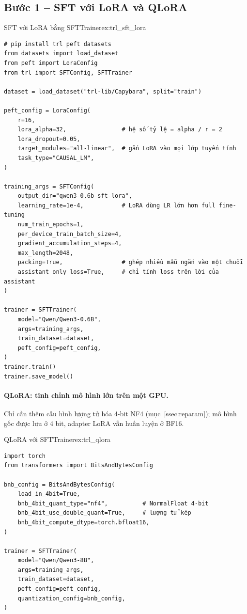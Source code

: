 \subsection{Bước 1 -- SFT với LoRA và QLoRA}
\label{ssec:trl_sft}

\begin{example}{SFT với LoRA bằng SFTTrainer}{ex:trl_sft_lora}
\begin{verbatim}
# pip install trl peft datasets
from datasets import load_dataset
from peft import LoraConfig
from trl import SFTConfig, SFTTrainer

dataset = load_dataset("trl-lib/Capybara", split="train")

peft_config = LoraConfig(
    r=16,
    lora_alpha=32,                # hệ số tỷ lệ = alpha / r = 2
    lora_dropout=0.05,
    target_modules="all-linear",  # gắn LoRA vào mọi lớp tuyến tính
    task_type="CAUSAL_LM",
)

training_args = SFTConfig(
    output_dir="qwen3-0.6b-sft-lora",
    learning_rate=1e-4,           # LoRA dùng LR lớn hơn full fine-tuning
    num_train_epochs=1,
    per_device_train_batch_size=4,
    gradient_accumulation_steps=4,
    max_length=2048,
    packing=True,                 # ghép nhiều mẫu ngắn vào một chuỗi
    assistant_only_loss=True,     # chỉ tính loss trên lời của assistant
)

trainer = SFTTrainer(
    model="Qwen/Qwen3-0.6B",
    args=training_args,
    train_dataset=dataset,
    peft_config=peft_config,
)
trainer.train()
trainer.save_model()
\end{verbatim}
\end{example}

\paragraph{QLoRA: tinh chỉnh mô hình lớn trên một GPU.} Chỉ cần thêm cấu hình lượng tử hóa 4-bit NF4 (mục~\ref{ssec:reparam}); mô hình gốc được lưu ở 4 bit, adapter LoRA vẫn huấn luyện ở BF16.

\begin{example}{QLoRA với SFTTrainer}{ex:trl_qlora}
\begin{verbatim}
import torch
from transformers import BitsAndBytesConfig

bnb_config = BitsAndBytesConfig(
    load_in_4bit=True,
    bnb_4bit_quant_type="nf4",          # NormalFloat 4-bit
    bnb_4bit_use_double_quant=True,     # lượng tử kép
    bnb_4bit_compute_dtype=torch.bfloat16,
)

trainer = SFTTrainer(
    model="Qwen/Qwen3-8B",
    args=training_args,
    train_dataset=dataset,
    peft_config=peft_config,
    quantization_config=bnb_config,
)
\end{verbatim}
\end{example}

